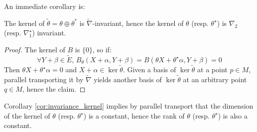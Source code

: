  An immediate corollary is:
 \begin{cor}
 \label{cor:invariance_kernel}
 The kernel of $\tilde{\theta} = \theta \oplus \theta^*$ is 
 $\tilde{\nabla}$-invariant, hence the kernel of $\theta$ (resp. $\theta^\star$) is $\nabla_2$ (resp. $\nabla_1^\star$) invariant.
 \end{cor}
 \begin{proof}
 The kernel of $B$ is $\{0\}$, so if:
 \begin{equation}
     \forall Y + \beta \in \tilde{E}, \, B_\theta \left( X+\alpha, Y+\beta\right) = B(\theta X + \theta^\star \alpha, Y + \beta) = 0
 \end{equation}
 Then $\theta X + \theta^\star \alpha = 0$ and $X + \alpha \in \ker \tilde{\theta}.$ Given a basis of $\ker \tilde{\theta}$ at a point $p \in M$, parallel transporting it by $\tilde{\nabla}$ yields another basis of $\ker \tilde{\theta}$ at an arbitrary point $q\in M$, hence the claim.
 \end{proof}
 \begin{rem}
Corollary \ref{cor:invariance_kernel} implies by parallel transport that the dimension of the kernel of $\theta$ (resp. $\theta^\star$) is a constant, hence the rank of $\theta$ (resp. $\theta^\star$) is also a constant. 
 \end{rem}


 